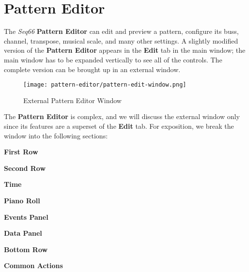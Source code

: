 %
%

\section{Pattern Editor}
\label{sec:pattern_editor}

   The \textsl{Seq66} \textbf{Pattern Editor} can edit and preview a
   pattern, configure its buss, channel, transpose, musical
   scale, and many other settings.
   A slightly modified  version of the \textbf{Pattern Editor} appears in the
   \textbf{Edit} tab in the main window; the main window has to be expanded
   vertically to see all of the controls.
   The complete version can be brought up in an external window.

\begin{figure}[H]
   \centering 
   \texttt{[image: pattern-editor/pattern-edit-window.png]}
   \caption{External Pattern Editor Window}
   \label{fig:pattern_editor_window}
\end{figure}
  
   The \textbf{Pattern Editor} is complex, and we will discuss the external
   window only since its features are a superset of the \textbf{Edit} tab.
   For exposition, we break the window into the following sections:

   \begin{enumber}
      \item \textbf{First Row}
      \item \textbf{Second Row}
      \item \textbf{Time}
      \item \textbf{Piano Roll}
      \item \textbf{Events Panel}
      \item \textbf{Data Panel}
      \item \textbf{Bottom Row}
      \item \textbf{Common Actions}
   \end{enumber}

